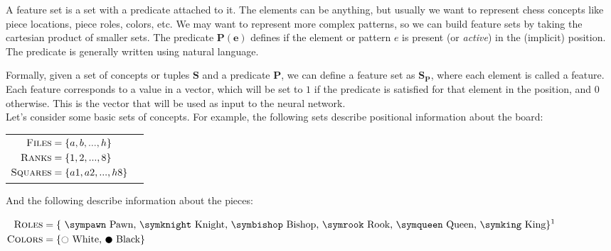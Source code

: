 A feature set is a set with a predicate attached to it. The elements can be anything, but usually we want to represent chess concepts like piece locations, piece roles, colors, etc. We may want to represent more complex patterns, so we can build feature sets by taking the cartesian product of smaller sets. The predicate $\bm{P(e)}$ defines if the element or pattern $e$ is present (or \textit{active}) in the (implicit) position. The predicate is generally written using natural language.

Formally, given a set of concepts or tuples $\bm{S}$ and a predicate $\bm{P}$, we can define a feature set as ${\bm S}_{\bm P}$, where each element is called a feature. Each feature corresponds to a value in a vector, which will be set to $1$ if the predicate is satisfied for that element in the position, and $0$ otherwise. This is the vector that will be used as input to the neural network. \\

Let's consider some basic sets of concepts. For example, the following sets describe positional information about the board:

\begin{center}
\begin{tabular}{cc}

$\begin{aligned}[t]
\textsc{Files} &= \{a, b, ..., h\} \\
\textsc{Ranks} &= \{1, 2, ..., 8\} \\
\textsc{Squares} &= \{a1, a2, ..., h8\}
\end{aligned}$

&

\raisebox{-10ex}{
\chessboard[
    tinyboard,
    showmover=false,
    pgfstyle={text},
    text=\fontsize{1.2ex}{1.2ex}\bfseries\sffamily \currentwq,
    markboard
]
}

\end{tabular}
\end{center}

And the following describe information about the pieces:

\begin{center}
$\begin{aligned}[t]
\featureset{Roles} &= \text{\{
    \sympawn\ Pawn,
    \symknight\ Knight,
    \symbishop\ Bishop,
    \symrook\ Rook,
    \symqueen\ Queen,
    \symking\ King\}}\textsuperscript{1} \\
\featureset{Colors} &= \text{\{\white\ White, \black\ Black\}}
\end{aligned}$
\end{center}

